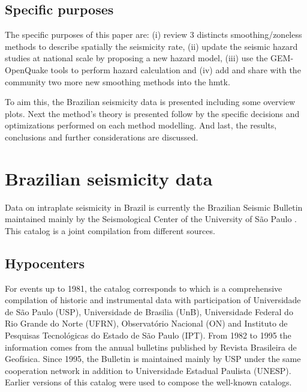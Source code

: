 \documentclass[grl]{agutex}
\begin{document}
\begin{article}
\subsection{Specific purposes}

The specific purposes of this paper are: (i) review 3 distincts smoothing/zoneless methods to describe spatially the seismicity rate, (ii) update the seismic hazard studies at national scale by proposing a new hazard model,
(iii) use the GEM-OpenQuake tools to perform hazard calculation and (iv) add and share with the community two more new smoothing methods into the \gls{hmtk}.

To aim this, the Brazilian seismicity data is presented including some overview plots. Next the method's theory is presented follow by the specific decisions and optimizations performed on each method modelling. And last, the results, conclusions and further considerations are discussed.


%
%

\section{Brazilian seismicity data}

Data on intraplate seismicity in Brazil is currently the Brazilian Seismic Bulletin maintained mainly by the Seismological Center of the University of São Paulo \citep{bsb_2014}. This catalog is a joint compilation from different sources.


\subsection{Hypocenters}

For events up to 1981, the catalog corresponds to \citet{berrocal_1984} which is a comprehensive compilation of historic and instrumental data with participation of Universidade de São Paulo (USP), Universidade de Brasilia (UnB), Universidade Federal do Rio Grande do Norte (UFRN), Observatório Nacional (ON) and Instituto de Pesquisas Tecnológicas do Estado de São Paulo (IPT). From 1982 to 1995 the information comes from the annual bulletins published by Revista Brasileira de Geofísica. Since 1995, the Bulletin is maintained mainly by USP under the same cooperation network in addition to Universidade Estadual Paulista (UNESP). Earlier versions of this catalog were used to compose the well-known \citet{ceresis_1985, ceresis_1995} catalogs.


\end{article}
\end{document}
